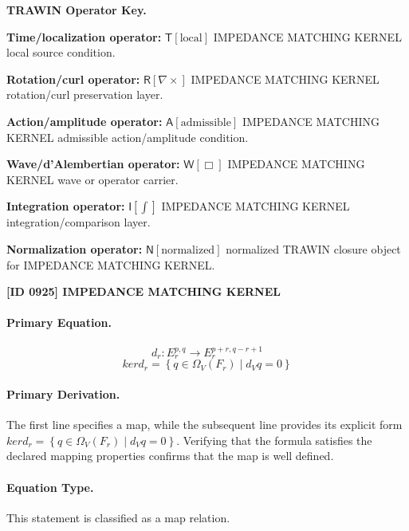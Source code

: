 \par\vspace{0.45\baselineskip}
\noindent\begin{minipage}[t]{\linewidth}
\begingroup
\small
\raggedright
\textbf{TRAWIN Operator Key.}\par
\noindent\textbf{Time/localization operator:} $\mathsf{T}\!\left[\mathrm{local}\right]$ IMPEDANCE MATCHING KERNEL local source condition.\par
\noindent\textbf{Rotation/curl operator:} $\mathsf{R}\!\left[\nabla\times\right]$ IMPEDANCE MATCHING KERNEL rotation/curl preservation layer.\par
\noindent\textbf{Action/amplitude operator:} $\mathsf{A}\!\left[\mathrm{admissible}\right]$ IMPEDANCE MATCHING KERNEL admissible action/amplitude condition.\par
\noindent\textbf{Wave/d'Alembertian operator:} $\mathsf{W}\!\left[\Box\right]$ IMPEDANCE MATCHING KERNEL wave or operator carrier.\par
\noindent\textbf{Integration operator:} $\mathsf{I}\!\left[\int\right]$ IMPEDANCE MATCHING KERNEL integration/comparison layer.\par
\noindent\textbf{Normalization operator:} $\mathsf{N}\!\left[\mathrm{normalized}\right]$ normalized TRAWIN closure object for IMPEDANCE MATCHING KERNEL.\par
\endgroup
\end{minipage}

\clearpage
\noindent\textbf{[ID 0925] IMPEDANCE MATCHING KERNEL}\par
\vspace{0.35em}
\paragraph{Primary Equation.}
\[
d_r\colon E_r^{p,q}\to E_r^{p+r,q-r+1}
\]
\[
ker d_r=\left\{q\in \Omega_V(F_r)\mid d_V q = 0\right\}
\]

\paragraph{Primary Derivation.}
The first line specifies a map, while the subsequent line provides its explicit form \( ker d_r=\left\{q\in \Omega_V(F_r)\mid d_V q = 0\right\} \). Verifying that the formula satisfies the declared mapping properties confirms that the map is well defined.
\paragraph{Equation Type.}
This statement is classified as a map relation.

